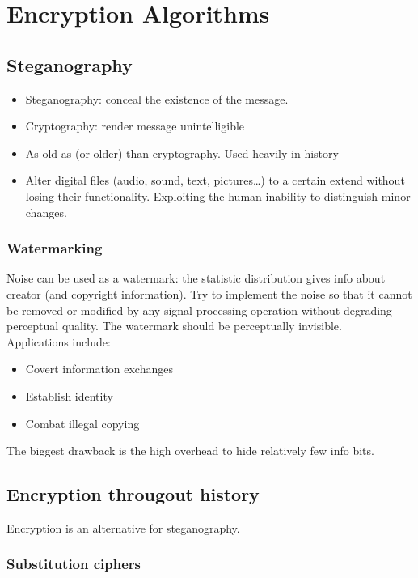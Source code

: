 \documentclass[11pt,british,faculty=ea,layout=titlefont,underline=false,titleUppercase=true,titleUnderline=true,hidelinks]{ugent2016-report}
\begin{document}
\chapter{Encryption Algorithms} \label{cha:encryption-algorithms}
	\section{Steganography} \label{sec:steganography}
		\begin{itemize}
			\item Steganography: conceal the existence of the message.
			\item Cryptography: render message unintelligible
			\item As old as (or older) than cryptography. Used heavily in history
			\item Alter digital files (audio, sound, text, pictures\dots) to a certain extend without losing their functionality. Exploiting the human inability to distinguish minor changes.
		\end{itemize}
		\subsection{Watermarking} \label{sub:watermarking}
			Noise can be used as a watermark: the statistic distribution gives info about creator (and copyright information).
			Try to implement the noise so that it cannot be removed or modified by any signal processing operation without degrading perceptual quality.
			The watermark should be perceptually invisible. \\
			Applications include:
			\begin{itemize}
				\item Covert information exchanges
				\item Establish identity
				\item Combat illegal copying
			\end{itemize}
			The biggest drawback is the high overhead to hide relatively few info bits.

	\section{Encryption througout history} \label{sec:encryption-throughout-history}
		Encryption is an alternative for steganography.

		\subsection{Substitution ciphers} \label{sub:substitution-ciphers}
\end{document}
